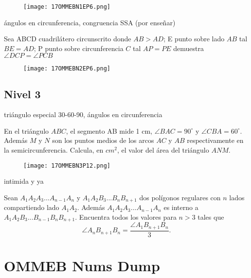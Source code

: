 \begin{figure}[h]
    \centering
    \texttt{[image: 17OMMEBN1EP6.png]}
\end{figure}

ángulos en circunferencia, congruencia SSA (por enseñar)

\begin{problem}[OMMEB 2017]
    Sea ABCD cuadrilátero circunscrito donde $AB>AD$; E punto 
    sobre lado $AB$ tal $BE=AD$; P punto sobre circunferencia 
    $C$ tal $AP=PE$ demuestra $\angle DCP=\angle PCB$
\end{problem}

\begin{figure}[h]
    \centering
    \texttt{[image: 17OMMEBN2EP6.png]}
\end{figure}

\section{Nivel 3}

triángulo especial 30-60-90, ángulos en circunferencia

\begin{problem}[OMMEB 2017]
    En el triángulo $ABC$, el segmento AB mide 1 cm, 
    $\angle BAC = 90^{\circ}$ y $\angle CBA = 60^{\circ}$. 
    Además $M$ y $N$ son los puntos medios de los arcos $AC$ y 
    $AB$ respectivamente en la semicircunferencia. Calcula, en 
    $cm^2$, el valor del área del triángulo $ANM$.
\end{problem}

\begin{figure}[h]
    \centering
    \texttt{[image: 17OMMEBN3P12.png]}
\end{figure}

intimida y ya

\begin{problem}[OMMEB 2017]
    Sean $A_1A_2A_3...A_{n-1}A_n$ y $A_1A_2B_3...B_nB_{n+1}$ 
    dos polígonos regulares con $n$ lados compartiendo lado 
    $A_1A_2$. Además $A_1A_2A_3...A_{n-1}A_n$ es interno a 
    $A_1A_2B_3...B_{n-1}B_nB_{n+1}$. Encuentra todos los valores 
    para $n>3$ tales que 
    \[
    \angle A_nB_{n+1}B_n= \frac{\angle A_1B_{n+1}B_n}{3}.
    \] 
\end{problem}

\chapter{OMMEB Nums Dump}


